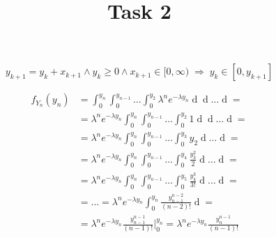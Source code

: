 \documentclass[a4paper,12pt] {article}
\title{Task 2}
\begin{document}
\maketitle
\thispagestyle{empty}
\begin{equation*}
y_{k+1} = y_k + x_{k+1} \land y_k \geq 0 \land x_{k+1} \in [0, \infty)\; \Rightarrow \; y_k \in [0, y_{k+1}]
\end{equation*}

\begin{align*}
 f_{Y_n}(y_n) &= \int_0^{y_n} \int_0^{y_{n-1}} \dots \int_0^{y_2} \lambda^n e^{-\lambda y_n} \mathop{dy_1}\mathop{dy_2} \dots \mathop{dy_{n-1}} = \\
 			  &= \lambda^n e^{-\lambda y_n} \int_0^{y_n} \int_0^{y_{n-1}} \dots \int_0^{y_2} 1 \mathop{dy_1}\mathop{dy_2} \dots \mathop{dy_{n-1}} = \\
 			  &= \lambda^n e^{-\lambda y_n} \int_0^{y_n} \int_0^{y_{n-1}} \dots \int_0^{y_3} y_2\mathop{dy_2} \dots \mathop{dy_{n-1}} = \\
 			  &= \lambda^n e^{-\lambda y_n} \int_0^{y_n} \int_0^{y_{n-1}} \dots \int_0^{y_4} \frac{y_3^2}{2}\mathop{dy_3} \dots \mathop{dy_{n-1}} = \\
 			  &= \lambda^n e^{-\lambda y_n} \int_0^{y_n} \int_0^{y_{n-1}} \dots \int_0^{y_5} \frac{y_4^3}{3!}\mathop{dy_4} \dots \mathop{dy_{n-1}} = \\
 			  &= \ldots = \lambda^n e^{-\lambda y_n} \int_0^{y_n} \frac{y_{n-1}^{n-2}}{(n-2)!} \mathop{dy_{n-1}} = \\
 			  &= \lambda^n e^{-\lambda y_n} \frac{y_{n-1}^{n-1}}{(n-1)!} \Big|_0^{y_n} = \lambda^n e^{-\lambda y_n} \frac{y_{n}^{n-1}}{(n-1)!} 
\end{align*}
\end{document}

